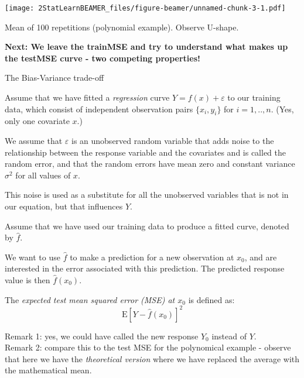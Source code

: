 \documentclass[ignorenonframetext,]{beamer}
\begin{document}
\begin{frame}

\texttt{[image: 2StatLearnBEAMER\_files/figure-beamer/unnamed-chunk-3-1.pdf]}

Mean of 100 repetitions (polynomial example). Observe U-shape.

\textbf{Next: We leave the trainMSE and try to understand what makes up
the testMSE curve - two competing properties!}

\end{frame}

\begin{frame}{The Bias-Variance trade-off}

Assume that we have fitted a \emph{regression} curve
\(Y = f(x) + \varepsilon\) to our training data, which consist of
independent observation pairs \(\{x_i, y_i\}\) for \(i=1,..,n\). (Yes,
only one covariate \(x\).)

We assume that \(\varepsilon\) is an unobserved random variable that
adds noise to the relationship between the response variable and the
covariates and is called the random error, and that the random errors
have mean zero and constant variance \(\sigma^2\) for all values of
\(x\).

This noise is used as a substitute for all the unobserved variables that
is not in our equation, but that influences \(Y\).

Assume that we have used our training data to produce a fitted curve,
denoted by \(\hat{f}\).

\end{frame}

\begin{frame}

We want to use \(\hat{f}\) to make a prediction for a new observation at
\(x_0\), and are interested in the error associated with this
prediction. The predicted response value is then \(\hat{f}(x_0)\).

The \emph{expected test mean squared error (MSE) at \(x_0\)} is defined
as: \[\text{E}[Y - \hat{f}(x_0)]^2\]

Remark 1: yes, we could have called the new response \(Y_0\) instead of
\(Y\).\\
Remark 2: compare this to the test MSE for the polynomical example -
observe that here we have the \emph{theoretical version} where we have
replaced the average with the mathematical mean.

\end{frame}
\end{document}
